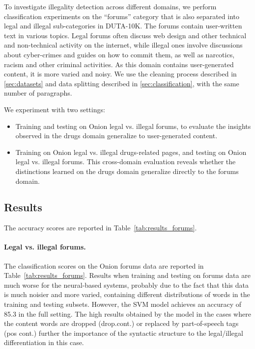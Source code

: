 \documentclass[11pt,a4paper,table]{article}
\begin{document}
{To investigate illegality detection across different domains, %
we perform classification experiments on the  ``forums'' category that is also separated into legal and illegal sub-categories in DUTA-10K.
The forums  contain user-written text in various topics. Legal forums often discuss web design and other technical
and non-technical activity on the internet, while illegal ones involve
discussions about cyber-crimes and guides on how to commit them,
as well as narcotics, racism and other criminal activities.
As this domain contains user-generated content, it is more varied
and noisy. We use the cleaning process described in \ref{sec:datasets} and data splitting described in \ref{sec:classification}, with the same number of paragraphs.

We experiment with two settings:
\begin{itemize}
\item Training and testing on Onion legal vs. illegal forums,
to evaluate the insights observed in the drugs domain generalize to user-generated content.
\item Training on Onion legal vs. illegal drugs-related pages,
and testing on Onion legal vs. illegal forums.
This cross-domain evaluation reveals whether the distinctions learned on the
drugs domain generalize directly to the forums domain.
\end{itemize}  

\subsection{Results}

The accuracy scores are reported in Table~\ref{tab:results_forums}.

\paragraph{Legal vs. illegal forums.}

The classification scores on the Onion forums data are reported in Table~\ref{tab:results_forums}.
Results when training and testing on forums data are much worse for the neural-based systems,
probably due to the fact that this data is much noisier and more varied,
containing different distributions of words in the training and testing
subsets. However, the SVM model achieves an accuracy of 85.3 in the full setting. The high results obtained by the model in the cases where the content words are dropped (drop.cont.) or replaced by part-of-speech tags (pos cont.) further the importance of the syntactic structure to the legal/illegal differentiation in this case. 

}
\end{document}
